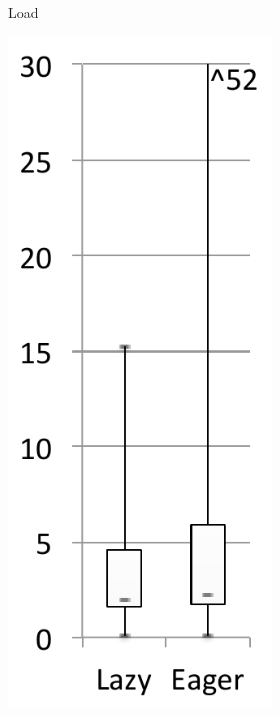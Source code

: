 \documentclass[sigplan,10pt,review,anonymous]{acmart}\settopmatter{printfolios=true,printccs=false,printacmref=false}
\begin{document}
\begin{figure}[bth]
\begin{subfigure}[b]{.48\textwidth}
\begin{subfigure}[b]{.24\textwidth}
		\caption{Load}
   	\end{subfigure}%
   	\begin{subfigure}[b]{.24\textwidth}
		\includegraphics[width=\linewidth]{figures/netBeansExp} 

\end{subfigure}
\end{subfigure}
\end{figure}
\end{document}
